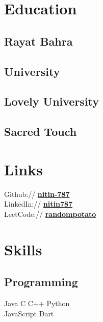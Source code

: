 \documentclass[]{deedy-resume-openfont}
\begin{document}

\begin{minipage}[t]{0.33\textwidth} 

\section{Education} 

\subsection{Rayat Bahra}
\subsection{University}
\sectionsep

\subsection{Lovely University}
\sectionsep

\subsection{Sacred Touch}
\sectionsep

\section{Links} 
Github:// \href{https://github.com/nitin-787}{\bf nitin-787} \\
LinkedIn://  \href{https://www.linkedin.com/in/nitin787/}{\bf nitin787} \\
LeetCode://  \href{https://leetcode.com/u/random_potato/}{\bf randompotato} \\

\section{Skills}
\subsection{Programming}
\textbullet{} Java \textbullet{}   C \textbullet{} C++ \textbullet{} Python \\ \textbullet{} JavaScript \textbullet{} Dart  \\\sectionsep


\end{minipage}
\end{document}

